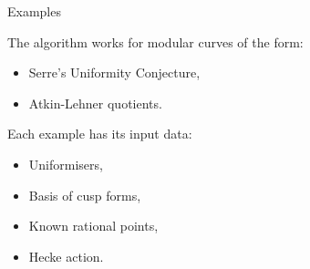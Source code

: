 \begin{frame}{Examples}

The algorithm works for modular curves of the form:

\begin{itemize}
\item Serre's Uniformity Conjecture,
\item Atkin-Lehner quotients.
\end{itemize}

Each example has its input data:

\begin{itemize}
\item Uniformisers,
\item Basis of cusp forms,
\item Known rational points,
\item Hecke action.
\end{itemize}
\end{frame}